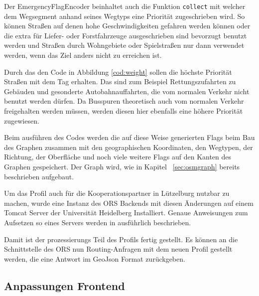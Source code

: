 Der EmergencyFlagEncoder beinhaltet auch die Funktion \texttt{collect} mit welcher dem Wegsegment anhand seines Wegtyps eine Priorität zugeschrieben wird.
So können Straßen auf denen hohe Geschwindigkeiten gefahren werden können oder die extra für Liefer- oder Forstfahrzeuge ausgeschrieben sind bevorzugt benutzt werden und Straßen durch Wohngebiete oder Spielstraßen nur dann verwendet werden, wenn das Ziel anders nicht zu erreichen ist.


Durch das den Code in Abbildung \ref{cod:weight} sollen die höchste Priorität Straßen mit dem Tag  erhalten.
Das sind zum Beispiel Rettungszufahrten zu Gebäuden und gesonderte Autobahnauffahrten, die vom normalen Verkehr nicht benutzt werden dürfen.
Da Busspuren theoretisch auch vom normalen Verkehr freigehalten werden müssen, werden diesen hier ebenfalls eine höhere Priorität zugewiesen.

Beim ausführen des Codes werden die auf diese Weise generierten Flags beim Bau des Graphen zusammen mit den geographischen Koordinaten, den Wegtypen, der Richtung, der Oberfläche und noch viele weitere Flags auf den Kanten des Graphen gespeichert.
Der Graph wird, wie in Kapitel ~\ref{sec:osmgraph} bereits beschrieben aufgebaut.

Um das Profil auch für die Kooperationspartner in Lützelburg nutzbar zu machen, wurde eine Instanz des ORS Backends mit diesen Änderungen auf einem Tomcat Server der Universität Heidelberg Installiert.
Genaue Anweisungen zum Aufsetzen so eines Servers werden in \cite{neisdoktor} ausführlich beschrieben.

Damit ist der prozessierungs Teil des Profils fertig gestellt.
Es können an die Schnittstelle des ORS nun Routing-Anfragen mit dem neuen Profil gestellt werden, die eine Antwort im GeoJson Format zurückgeben.

%
%
%
%

\subsection{Anpassungen Frontend}

